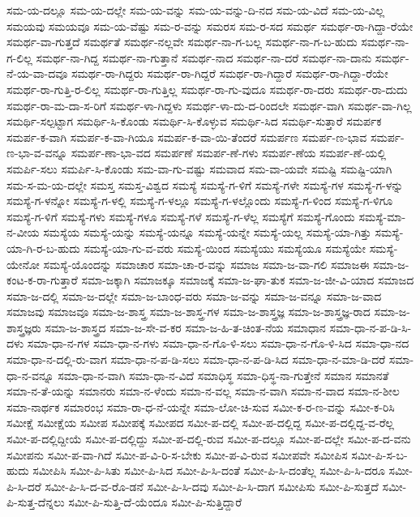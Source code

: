 {ಸಮ-ಯ-ದಲ್ಲೂ
ಸಮ-ಯ-ದಲ್ಲೇ
ಸಮ-ಯ-ವನ್ನು
ಸಮ-ಯ-ವನ್ನು-ದಿ-ನದ
ಸಮ-ಯ-ವಿದೆ
ಸಮ-ಯ-ವಿಲ್ಲ
ಸಮಯವು
ಸಮಯವೂ
ಸಮ-ಯ-ವೆಷ್ಟು
ಸಮ-ರ-ವನ್ನು
ಸಮರಸ
ಸಮ-ರ-ಸದ
ಸಮರ್ಥ
ಸಮರ್ಥ-ರಾ-ಗಿದ್ದಾ-ರೆಯೇ
ಸಮರ್ಥ-ವಾ-ಗುತ್ತದೆ
ಸಮರ್ಥತೆ
ಸಮರ್ಥ-ನಲ್ಲವೇ
ಸಮರ್ಥ-ನಾ-ಗ-ಬಲ್ಲ
ಸಮರ್ಥ-ನಾ-ಗ-ಬ-ಹುದು
ಸಮರ್ಥ-ನಾ-ಗ-ಲಿಲ್ಲ
ಸಮರ್ಥ-ನಾ-ಗಿದ್ದ
ಸಮರ್ಥ-ನಾ-ಗುತ್ತಾನೆ
ಸಮರ್ಥ-ನಾದ
ಸಮರ್ಥ-ನಾ-ದರೆ
ಸಮರ್ಥ-ನಾ-ದಾನು
ಸಮರ್ಥ-ನೆ-ಯ-ವಾ-ದವೂ
ಸಮರ್ಥ-ರಾ-ಗಿದ್ದರು
ಸಮರ್ಥ-ರಾ-ಗಿದ್ದರೆ
ಸಮರ್ಥ-ರಾ-ಗಿದ್ದಾರೆ
ಸಮರ್ಥ-ರಾ-ಗಿದ್ದಾ-ರೆಯೇ
ಸಮರ್ಥ-ರಾ-ಗುತ್ತಿ-ರ-ಲಿಲ್ಲ
ಸಮರ್ಥ-ರಾ-ಗುತ್ತಿಲ್ಲ
ಸಮರ್ಥ-ರಾ-ಗು-ವುದೂ
ಸಮರ್ಥ-ರಾ-ದರು
ಸಮರ್ಥ-ರಾ-ದುದು
ಸಮರ್ಥ-ರಾ-ಮ-ದಾ-ಸ-ರಿಗೆ
ಸಮರ್ಥ-ಳಾ-ಗಿದ್ದಳು
ಸಮರ್ಥ-ಳಾ-ದು-ದ-ರಿಂದಲೇ
ಸಮರ್ಥ-ವಾಗಿ
ಸಮರ್ಥ-ವಾ-ಗಿಲ್ಲ
ಸಮರ್ಥಿ-ಸಲ್ಪಟ್ಟಾಗ
ಸಮರ್ಥಿ-ಸಿ-ಕೊಂಡು
ಸಮರ್ಥಿ-ಸಿ-ಕೊಳ್ಳುವ
ಸಮರ್ಥಿ-ಸಿದ
ಸಮರ್ಥಿ-ಸುತ್ತಾರೆ
ಸಮರ್ಪಕ
ಸಮರ್ಪ-ಕ-ವಾಗಿ
ಸಮರ್ಪ-ಕ-ವಾ-ಗಿಯೂ
ಸಮರ್ಪ-ಕ-ವಾ-ಯಿ-ತೆಂದರೆ
ಸಮರ್ಪಣ
ಸಮರ್ಪ-ಣ-ಭಾವ
ಸಮರ್ಪ-ಣ-ಭಾ-ವ-ವನ್ನೂ
ಸಮರ್ಪ-ಣಾ-ಭಾ-ವದ
ಸಮರ್ಪಣೆ
ಸಮರ್ಪ-ಣೆ-ಗಳು
ಸಮರ್ಪ-ಣೆಯ
ಸಮರ್ಪ-ಣೆ-ಯಲ್ಲಿ
ಸಮರ್ಪಿ-ಸಲು
ಸಮರ್ಪಿ-ಸಿ-ಕೊಂಡು
ಸಮ-ವಾ-ಗು-ವಷ್ಟು
ಸಮವಾದ
ಸಮ-ವಾ-ಯವೇ
ಸಮಷ್ಟಿ
ಸಮಷ್ಟಿ-ಯಾಗಿ
ಸಮ-ಸ-ಮ-ಯ-ದಲ್ಲೇ
ಸಮಸ್ತ
ಸಮಸ್ತ-ವಿಶ್ವದ
ಸಮಸ್ಯೆ
ಸಮಸ್ಯೆ-ಗ-ಳಿಗೆ
ಸಮಸ್ಯೆ-ಗಳೇ
ಸಮಸ್ಯೆ-ಗಳ
ಸಮಸ್ಯೆ-ಗ-ಳನ್ನು
ಸಮಸ್ಯೆ-ಗ-ಳನ್ನೋ
ಸಮಸ್ಯೆ-ಗ-ಳಲ್ಲಿ
ಸಮಸ್ಯೆ-ಗ-ಳಲ್ಲೂ
ಸಮಸ್ಯೆ-ಗ-ಳಲ್ಲೊಂದು
ಸಮಸ್ಯೆ-ಗ-ಳಿಂದ
ಸಮಸ್ಯೆ-ಗ-ಳಿಗೂ
ಸಮಸ್ಯೆ-ಗ-ಳಿಗೆ
ಸಮಸ್ಯೆ-ಗಳು
ಸಮಸ್ಯೆ-ಗಳೂ
ಸಮಸ್ಯೆ-ಗಳೆ
ಸಮಸ್ಯೆ-ಗ-ಳೆಲ್ಲ
ಸಮಸ್ಯೆಗೆ
ಸಮಸ್ಯೆ-ಗೊಂದು
ಸಮಸ್ಯೆ-ಮಾ-ನ-ವೀಯ
ಸಮಸ್ಯೆಯ
ಸಮಸ್ಯೆ-ಯನ್ನು
ಸಮಸ್ಯೆ-ಯನ್ನೂ
ಸಮಸ್ಯೆ-ಯನ್ನೇ
ಸಮಸ್ಯೆ-ಯಲ್ಲ
ಸಮಸ್ಯೆ-ಯಾ-ಗಿತ್ತು
ಸಮಸ್ಯೆ-ಯಾ-ಗಿ-ರ-ಬ-ಹುದು
ಸಮಸ್ಯೆ-ಯಾ-ಗು-ವ-ವರು
ಸಮಸ್ಯೆ-ಯಿಂದ
ಸಮಸ್ಯೆಯು
ಸಮಸ್ಯೆಯೂ
ಸಮಸ್ಯೆಯೇ
ಸಮಸ್ಯೆ-ಯೇನೋ
ಸಮಸ್ಯೆ-ಯೊಂದನ್ನು
ಸಮಾಚಾರ
ಸಮಾ-ಚಾ-ರ-ವನ್ನು
ಸಮಾಜ
ಸಮಾ-ಜ-ವಾ-ಗಲಿ
ಸಮಾಜಈ
ಸಮಾ-ಜ-ಕಂಟ-ಕ-ರಾ-ಗುತ್ತಾರೆ
ಸಮಾ-ಜಕ್ಕಾಗಿ
ಸಮಾಜಕ್ಕೂ
ಸಮಾಜಕ್ಕೆ
ಸಮಾ-ಜ-ಘಾ-ತುಕ
ಸಮಾ-ಜ-ಜೀ-ವಿ-ಯಾದ
ಸಮಾಜದ
ಸಮಾ-ಜ-ದಲ್ಲಿ
ಸಮಾ-ಜ-ದಲ್ಲೇ
ಸಮಾ-ಜ-ಬಾಂಧ-ವರು
ಸಮಾ-ಜ-ವನ್ನು
ಸಮಾ-ಜ-ವನ್ನೂ
ಸಮಾ-ಜ-ವಾದ
ಸಮಾಜವು
ಸಮಾಜವೂ
ಸಮಾ-ಜ-ಶಾಸ್ತ್ರ
ಸಮಾ-ಜ-ಶಾಸ್ತ್ರ-ಗಳ
ಸಮಾ-ಜ-ಶಾಸ್ತ್ರಜ್ಞ
ಸಮಾ-ಜ-ಶಾಸ್ತ್ರಜ್ಞ-ರಾದ
ಸಮಾ-ಜ-ಶಾಸ್ತ್ರಜ್ಞರು
ಸಮಾ-ಜ-ಶಾಸ್ತ್ರದ
ಸಮಾ-ಜ-ಸೇ-ವ-ಕರ
ಸಮಾ-ಜ-ಹಿ-ತ-ಚಿಂತ-ನೆಯ
ಸಮಾಧಾನ
ಸಮಾ-ಧಾ-ನ-ಪ-ಡಿ-ಸಿ-ದಳು
ಸಮಾ-ಧಾ-ನ-ಗಳ
ಸಮಾ-ಧಾ-ನ-ಗಳು
ಸಮಾ-ಧಾ-ನ-ಗೊ-ಳಿ-ಸಲು
ಸಮಾ-ಧಾ-ನ-ಗೊ-ಳಿ-ಸಿದ
ಸಮಾ-ಧಾ-ನದ
ಸಮಾ-ಧಾ-ನ-ದಲ್ಲಿ-ರು-ವಾಗ
ಸಮಾ-ಧಾ-ನ-ಪ-ಡಿ-ಸಲು
ಸಮಾ-ಧಾ-ನ-ಪ-ಡಿ-ಸಿದ
ಸಮಾ-ಧಾ-ನ-ಮಾ-ಡಿ-ದರೆ
ಸಮಾ-ಧಾ-ನ-ವನ್ನೂ
ಸಮಾ-ಧಾ-ನ-ವಾಗಿ
ಸಮಾ-ಧಾ-ನ-ವಿದೆ
ಸಮಾಧಿಸ್ಥ
ಸಮಾ-ಧಿಸ್ಥ-ನಾ-ಗುತ್ತೇನೆ
ಸಮಾನ
ಸಮಾನತೆ
ಸಮಾ-ನ-ತೆ-ಯನ್ನು
ಸಮಾನರು
ಸಮಾ-ನ-ಳೆಂದು
ಸಮಾ-ನ-ವಲ್ಲ
ಸಮಾ-ನ-ವಾಗಿ
ಸಮಾ-ನ-ವಾದ
ಸಮಾ-ನ-ಶೀಲ
ಸಮಾ-ನಾರ್ಥಕ
ಸಮಾರಂಭ
ಸಮಾ-ರಾ-ಧ-ನೆ-ಯನ್ನೇ
ಸಮಾ-ಲೋ-ಚಿ-ಸುವ
ಸಮೀ-ಕ-ರ-ಣ-ವನ್ನು
ಸಮೀ-ಕ-ರಿಸಿ
ಸಮೀಕ್ಷೆ
ಸಮೀಕ್ಷೆಯ
ಸಮೀಪ
ಸಮೀಪಕ್ಕೆ
ಸಮೀಪದ
ಸಮೀ-ಪ-ದಲ್ಲಿ
ಸಮೀ-ಪ-ದಲ್ಲಿದ್ದ
ಸಮೀ-ಪ-ದಲ್ಲಿದ್ದ-ವ-ರೆಲ್ಲ
ಸಮೀ-ಪ-ದಲ್ಲಿದ್ದೀಯೆ
ಸಮೀ-ಪ-ದಲ್ಲಿದ್ದು
ಸಮೀ-ಪ-ದಲ್ಲಿ-ರುವ
ಸಮೀ-ಪ-ದಲ್ಲೂ
ಸಮೀ-ಪ-ದಲ್ಲೇ
ಸಮೀ-ಪ-ದ-ವನು
ಸಮೀಪನು
ಸಮೀ-ಪ-ವಾ-ಗಿದೆ
ಸಮೀ-ಪ-ವಿ-ರಿ-ಸ-ಬೇಕು
ಸಮೀ-ಪ-ವಿ-ರುವ
ಸಮೀಪವೇ
ಸಮೀಪಿಸ
ಸಮೀ-ಪಿ-ಸ-ಬ-ಹುದು
ಸಮೀಪಿಸಿ
ಸಮೀ-ಪಿ-ಸಿತು
ಸಮೀ-ಪಿ-ಸಿದ
ಸಮೀ-ಪಿ-ಸಿ-ದಂತೆ
ಸಮೀ-ಪಿ-ಸಿ-ದಂತೆಲ್ಲ
ಸಮೀ-ಪಿ-ಸಿ-ದರೂ
ಸಮೀ-ಪಿ-ಸಿ-ದರೆ
ಸಮೀ-ಪಿ-ಸಿ-ದ-ವ-ರೊ-ಡನೆ
ಸಮೀ-ಪಿ-ಸಿ-ದವು
ಸಮೀ-ಪಿ-ಸಿ-ದಾಗ
ಸಮೀಪಿಸು
ಸಮೀ-ಪಿ-ಸುತ್ತದೆ
ಸಮೀ-ಪಿ-ಸುತ್ತ-ದೆನ್ನಲು
ಸಮೀ-ಪಿ-ಸುತ್ತಿ-ದೆ-ಯೆಂದೂ
ಸಮೀ-ಪಿ-ಸುತ್ತಿದ್ದಾರೆ
}
